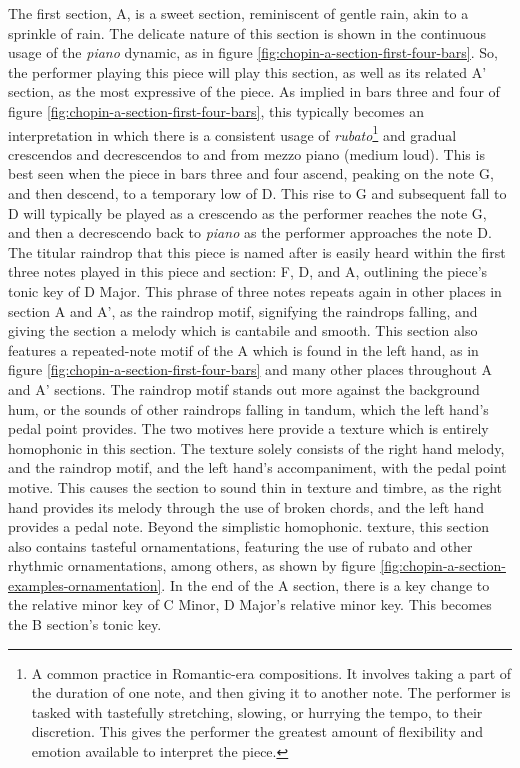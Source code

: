 The first section, A, is a sweet section, reminiscent of gentle rain, akin to a sprinkle of rain. The delicate nature of this section is shown in the continuous usage of the \textit{piano} dynamic, as in figure \ref{fig:chopin-a-section-first-four-bars}\autocite{Hansen_1973}. So, the performer playing this piece will play this section, as well as its related A' section, as the most expressive of the piece. As implied in bars three and four of figure \ref{fig:chopin-a-section-first-four-bars}\autocite{Hansen_1973}, this typically becomes an interpretation in which there is a consistent usage of \textit{rubato}\autocite{Cole_Schwartz}\footnote{A common practice in Romantic-era compositions. It involves taking a part of the duration of one note, and then giving it to another note. The performer is tasked with tastefully stretching, slowing, or hurrying the tempo, to their discretion. This gives the performer the greatest amount of flexibility and emotion available to interpret the piece.} and gradual crescendos and decrescendos to and from mezzo piano (medium loud). This is best seen when the piece in bars three and four ascend, peaking on the note G, and then descend, to a temporary low of D. This rise to G and subsequent fall to D will typically be played as a crescendo as the performer reaches the note G, and then a decrescendo back to \textit{piano} as the performer approaches the note D. The titular raindrop that this piece is named after is easily heard within the first three notes played in this piece and section: F, D\musFlat{}, and A\musFlat{}, outlining the piece's tonic key of D\musFlat{} Major. This phrase of three notes repeats again in other places in section A and A', as the raindrop motif, signifying the raindrops falling, and giving the section a melody which is cantabile and smooth. This section also features a repeated-note motif of the A\musFlat{} which is found in the left hand, as in figure \ref{fig:chopin-a-section-first-four-bars}\autocite{Hansen_1973} and many other places throughout A and A' sections. The raindrop motif stands out more against the background hum, or the sounds of other raindrops falling in tandum, which the left hand's pedal point provides. The two motives here provide a texture which is entirely homophonic in this section. The texture solely consists of the right hand melody, and the raindrop motif, and the left hand's accompaniment, with the pedal point motive. This causes the section to sound thin in texture and timbre, as the right hand provides its melody through the use of broken chords, and the left hand provides a pedal note. Beyond the simplistic homophonic. texture, this section also contains tasteful ornamentations, featuring the use of rubato and other rhythmic ornamentations, among others, as shown by figure \ref{fig:chopin-a-section-examples-ornamentation}. In the end of the A section, there is a key change to the relative minor key of C\musSharp{} Minor, D\musFlat{} Major's relative minor key. This becomes the B section's tonic key.

